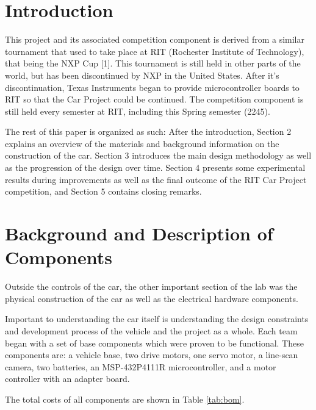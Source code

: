\documentclass[conference]{IEEEtran}
\begin{document}
\section{Introduction}
    This project and its associated competition component is derived from
    a similar tournament that used to take place at RIT 
    (Rochester Institute of Technology), that being the NXP
    Cup [1]. This tournament is still held in other parts of the world, but has
    been discontinued by NXP in the United States. After it's discontinuation, Texas Instruments began to provide
    microcontroller boards to RIT so that the Car Project could be continued.
    The competition component is still held every semester at RIT, including
    this Spring semester (2245).

    The rest of this paper is organized as such: After the introduction,
    Section 2 explains an overview of the materials and background information
    on the construction of the car. Section 3 introduces the main design
    methodology as well as the progression of the design over time. Section
    4 presents some experimental results during improvements as well as
    the final outcome of the RIT Car Project competition, and Section 5
    contains closing remarks.

\section{Background and Description of Components}
    Outside the controls of the car, the other important section of the lab
    was the physical construction of the car as well as the electrical
    hardware components. 

    Important to understanding the car itself is understanding the design
    constraints and development process of the vehicle and the project as a
    whole. Each team began with a set of base components which were proven to
    be functional. These components are: a vehicle base, two drive motors,
    one servo motor, a line-scan camera, two batteries, an MSP-432P4111R
    microcontroller, and a motor controller with an adapter board. 

    The total costs of all components are shown in Table \ref{tab:bom}.
\end{document}
